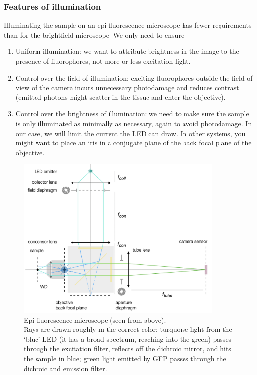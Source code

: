 \documentclass[a4paper]{report}
\begin{document}
	\subsubsection{Features of illumination}
	Illuminating the sample on an epi-fluorescence microscope has fewer requirements than for the brightfield microscope. We only need to ensure
	\begin{enumerate}
	    \item Uniform illumination: we want to attribute brightness in the image to the presence of fluorophores, not more or less excitation light.
	    \item Control over the field of illumination: exciting fluorophores outside the field of view of the camera incurs unnecessary photodamage and reduces contrast (emitted photons might scatter in the tissue and enter the objective). 
	    \item Control over the brightness of illumination: we need to make sure the sample is only illuminated as minimally as necessary, again to avoid photodamage. In our case, we will limit the current the LED can draw. In other systems, you might want to place an iris in a conjugate plane of the back focal plane of the objective.
	\end{enumerate}
	
	\begin{figure}[h]
		\center
		\includegraphics[width=0.9\textwidth]{figures/epifluo.png}
		\captionsetup{width=0.9\textwidth}
		\caption{Epi-fluorescence microscope (seen from above). 
		\\
		Rays are drawn roughly in the correct color: turquoise light from the `blue' LED (it has a broad spectrum, reaching into the green) passes through the excitation filter, reflects off the dichroic mirror, and hits the sample in blue; green light emitted by GFP passes through the dichroic and emission filter.}
		\label{fig:epifluo}
	\end{figure}
	
\end{document}
